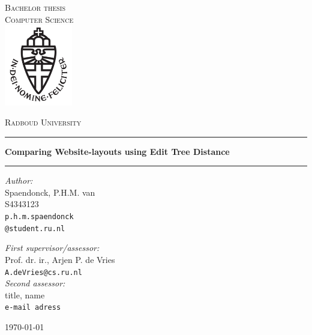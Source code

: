 \documentclass[11pt,a4paper]{report}
\begin{document}
\begin{titlepage}
\begin{center}
\textsc{\LARGE Bachelor thesis\\Computer Science}\\[1.5cm]
\includegraphics[height=100pt]{logo}

\vspace{0.4cm}
\textsc{\Large Radboud University}\\[1cm]
\hrule
\vspace{0.4cm}
\textbf{\huge Comparing Website-layouts using Edit Tree Distance}\\[0.4cm]
\hrule
\vspace{2cm}
\begin{minipage}[t]{0.45\textwidth}
\begin{flushleft} \large
\textit{Author:}\\
Spaendonck, P.H.M. van\\
S4343123\\
\texttt{p.h.m.spaendonck\\ @student.ru.nl}
\end{flushleft}
\end{minipage}
\begin{minipage}[t]{0.45\textwidth}
\begin{flushright} \large
\textit{First supervisor/assessor:}\\
Prof. dr. ir., Arjen P. de Vries\\
\texttt{A.deVries@cs.ru.nl}\\[1.3cm]
\textit{Second assessor:}\\
title, name\\
\texttt{e-mail adress}
\end{flushright}
\end{minipage}
\vfill
{\large \today}
\end{center}
\end{titlepage}



\tableofcontents










\appendix

\end{document}
